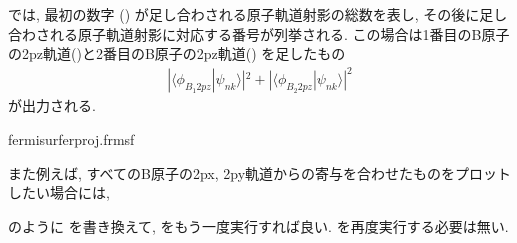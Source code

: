 \documentclass[letterpaper,10pt,dvipdfmx,openany]{sphinxmanual}
\begin{document}
\sphinxAtStartPar
では, 最初の数字 () が足し合わされる原子軌道射影の総数を表し,
その後に足し合わされる原子軌道射影に対応する番号が列挙される.
この場合は1番目のB原子の2pz軌道()と2番目のB原子の2pz軌道()
を足したもの
\begin{equation*}
\begin{split}|\langle \phi_{B_1 2pz} | \psi_{nk} \rangle|^2
+ |\langle \phi_{B_2 2pz} | \psi_{nk} \rangle|^2\end{split}
\end{equation*}
\sphinxAtStartPar
が出力される.

\begin{sphinxVerbatim}[commandchars=\\\{\}]
\PYGZdl{}fermisurferproj.frmsf
\end{sphinxVerbatim}

\begin{figure}[htbp]
\centering

\noindent{}
\end{figure}

\sphinxAtStartPar
また例えば, すべてのB原子の2px, 2py軌道からの寄与を合わせたものをプロットしたい場合には,

\begin{sphinxVerbatim}[commandchars=\\\{\}]
  
   
\end{sphinxVerbatim}

\sphinxAtStartPar
のように  を書き換えて,  をもう一度実行すれば良い.
 を再度実行する必要は無い.

\begin{figure}[htbp]
\centering

\noindent{}
\end{figure}
\end{document}
